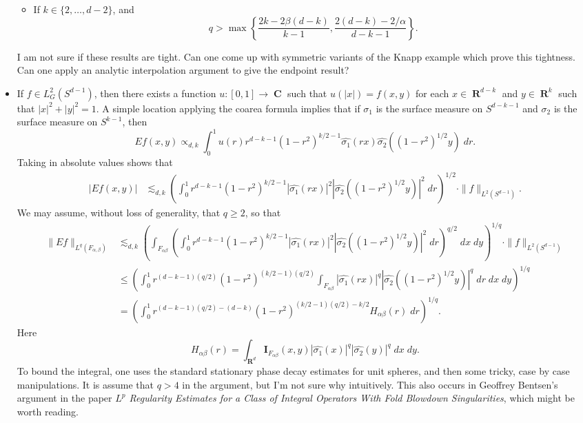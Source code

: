 \documentclass[openany,nobib,nols,a4paper,twoside,symmetric,justified,notoc]{tufte-book}
\theoremstyle{plain}
\theoremstyle{remark}
\theoremstyle{definition}
\DeclareMathOperator{\RR}{\mathbf{R}}
\DeclareMathOperator{\CC}{\mathbf{C}}
\begin{document}
\begin{itemize}
\begin{itemize}
        \item If $k \in \{ 2, \dots, d - 2 \}$, and
        \[ q > \max \left\{ \frac{2k - 2\beta(d-k)}{k-1}, \frac{2(d-k) - 2/\alpha}{d - k - 1} \right\}. \]
    \end{itemize}
    I am not sure if these results are tight. Can one come up with symmetric variants of the Knapp example which prove this tightness. Can one apply an analytic interpolation argument to give the endpoint result?

    \item If $f \in L^2_G(S^{d-1})$, then there exists a function $u: [0,1] \to \CC$ such that $u(|x|) = f(x,y)$ for each $x \in \RR^{d-k}$ and $y \in \RR^k$ such that $|x|^2 + |y|^2 = 1$. A simple location applying the coarea formula implies that if $\sigma_1$ is the surface measure on $S^{d-k-1}$ and $\sigma_2$ is the surface measure on $S^{k-1}$, then
    \[ Ef(x,y) \propto_{d,k} \int_0^1 u(r) r^{d-k-1} (1 - r^2)^{k/2 - 1} \widehat{\sigma_1}(rx) \widehat{\sigma_2}((1 - r^2)^{1/2} y)\; dr. \]
    Taking in absolute values shows that
    \begin{align*}
        |Ef(x,y)| &\lesssim_{d,k} \left( \int_0^1 r^{d-k-1} (1 - r^2)^{k/2 - 1} |\widehat{\sigma_1}(rx)|^2 |\widehat{\sigma_2}((1 - r^2)^{1/2}y)|^2\; dr \right)^{1/2} \cdot \| f \|_{L^2(S^{d-1})}.
    \end{align*}
    We may assume, without loss of generality, that $q \geq 2$, so that
    \begin{align*}
        \| Ef \|_{L^q(F_{\alpha,\beta})} &\lesssim_{d,k} \left( \int_{F_{\alpha \beta}} \left( \int_0^1 r^{d-k-1} (1 - r^2)^{k/2 - 1} |\widehat{\sigma_1}(rx)|^2 |\widehat{\sigma_2}((1 - r^2)^{1/2}y)|^2\; dr \right)^{q/2}\; dx\; dy \right)^{1/q} \cdot \| f \|_{L^2(S^{d-1})}\\
        &\leq \left( \int_0^1 r^{(d-k-1)(q/2)} (1 - r^2)^{(k/2-1)(q/2)} \int_{F_{\alpha \beta}} |\widehat{\sigma_1}(rx)|^q |\widehat{\sigma_2}((1 - r^2)^{1/2} y)|^q\; dr\; dx\; dy \right)^{1/q}\\
        &= \left( \int_0^1 r^{(d-k-1)(q/2) - (d-k)} (1 - r^2)^{(k/2-1)(q/2) - k/2} H_{\alpha\beta}(r)\; dr \right)^{1/q}.
    \end{align*}
    Here
    \[ H_{\alpha \beta}(r) = \int_{\RR^d} \mathbf{I}_{F_{\alpha \beta}}(x,y) |\widehat{\sigma_1}(x)|^q |\widehat{\sigma_2}(y)|^q\; dx\; dy. \]
    To bound the integral, one uses the standard stationary phase decay estimates for unit spheres, and then some tricky, case by case manipulations. It is assume that $q > 4$ in the argument, but I'm not sure why intuitively. This also occurs in Geoffrey Bentsen's argument in the paper \emph{$L^p$ Regularity Estimates for a Class of Integral Operators With Fold Blowdown Singularities}, which might be worth reading.


\end{itemize}
\end{document}
